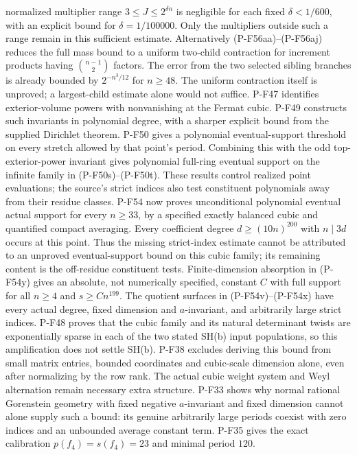 \begin{description}
normalized multiplier range $3\le J\le2^{\delta n}$ is
negligible for each fixed $\delta<1/600$, with an explicit
bound for $\delta=1/100000$. Only the multipliers outside
such a range remain in this sufficient estimate.
Alternatively (P-F56aa)--(P-F56aj) reduces the full mass
bound to a uniform two-child contraction for increment
products having $\binom{n-1}{2}$ factors. The error from
the two selected sibling branches is already bounded by
$2^{-n^3/12}$ for $n\ge48$. The uniform contraction itself
is unproved; a largest-child estimate alone would not suffice.
P-F47 identifies exterior-volume powers with nonvanishing at the
Fermat cubic. P-F49 constructs such invariants in polynomial
degree, with a sharper explicit bound from the supplied Dirichlet
theorem. P-F50 gives a polynomial eventual-support threshold on
every stretch allowed by that point's period. Combining this
with the odd top-exterior-power invariant gives polynomial
full-ring eventual support on the infinite family in
(P-F50s)--(P-F50t). These results
control realized point evaluations; the source's strict indices
also test constituent polynomials away from their residue classes.
P-F54 now proves unconditional polynomial eventual actual support
for every $n\ge33$, by a specified exactly balanced cubic and
quantified compact averaging. Every coefficient degree
$d\ge(10n)^{200}$ with $n\mid3d$ occurs at this point. Thus
the missing strict-index estimate cannot be attributed to an
unproved eventual-support bound on this cubic family; its
remaining content is the off-residue constituent tests.
Finite-dimension absorption in (P-F54y) gives an absolute,
not numerically specified, constant $C$ with full support for
all $n\ge4$ and $s\ge Cn^{199}$. The quotient surfaces in
(P-F54v)--(P-F54x) have every actual degree, fixed dimension
and $a$-invariant, and arbitrarily large strict indices.
P-F48 proves that the cubic family and its natural determinant
twists are exponentially sparse in each of the two stated SH(b)
input populations, so this amplification does not settle SH(b).
P-F38 excludes deriving this bound from small matrix entries, bounded
coordinates and cubic-scale dimension alone, even after normalizing by
the row rank. The actual cubic weight system and Weyl alternation remain
necessary extra structure. P-F33 shows why normal rational Gorenstein geometry with fixed
negative $a$-invariant and fixed dimension cannot alone supply
such a bound: its genuine arbitrarily large periods coexist with
zero indices and an unbounded average constant term. P-F35 gives
the exact calibration $p(f_4)=s(f_4)=23$ and minimal period $120$.


\end{description}
